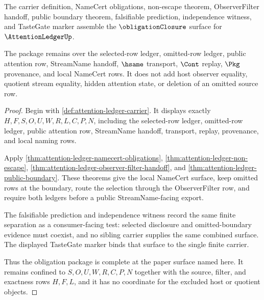 \begin{theorem}
\label{thm:attention-ledger-obligation-closure-package}
The carrier definition, NameCert obligations, non-escape theorem, ObserverFilter handoff, public boundary theorem, falsifiable prediction, independence witness, and TasteGate marker assemble the $\obligationClosure$ surface for $\AttentionLedgerUp$.

The package remains over the selected-row ledger, omitted-row ledger, public attention row, StreamName handoff, $\hsame$ transport, $\Cont$ replay, $\Pkg$ provenance, and local NameCert rows. It does not add host observer equality, quotient stream equality, hidden attention state, or deletion of an omitted source row.
\end{theorem}
\begin{proof}
Begin with \autoref{def:attention-ledger-carrier}. It displays exactly $H,F,S,O,U,W,R,L,C,P,N$, including the selected-row ledger, omitted-row ledger, public attention row, StreamName handoff, transport, replay, provenance, and local naming rows.

Apply \autoref{thm:attention-ledger-namecert-obligations}, \autoref{thm:attention-ledger-non-escape}, \autoref{thm:attention-ledger-observer-filter-handoff}, and \autoref{thm:attention-ledger-public-boundary}. These theorems give the local NameCert surface, keep omitted rows at the boundary, route the selection through the ObserverFilter row, and require both ledgers before a public StreamName-facing export.

The falsifiable prediction and independence witness record the same finite separation as a consumer-facing test: selected disclosure and omitted-boundary evidence must coexist, and no sibling carrier supplies the same combined surface. The displayed TasteGate marker binds that surface to the single finite carrier.

Thus the obligation package is complete at the paper surface named here. It remains confined to $S,O,U,W,R,C,P,N$ together with the source, filter, and exactness rows $H,F,L$, and it has no coordinate for the excluded host or quotient objects.
\end{proof}

